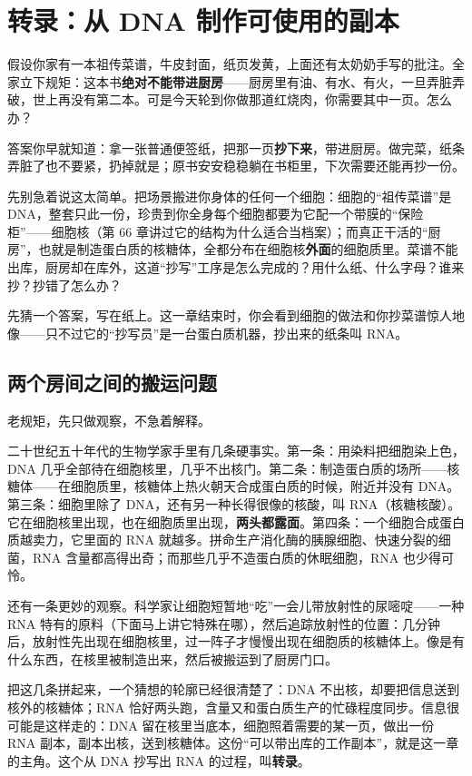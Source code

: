 \chapter{转录：从 DNA 制作可使用的副本}

\begin{kaichang}
假设你家有一本祖传菜谱，牛皮封面，纸页发黄，上面还有太奶奶手写的批注。全家立下规矩：这本书\textbf{绝对不能带进厨房}——厨房里有油、有水、有火，一旦弄脏弄破，世上再没有第二本。可是今天轮到你做那道红烧肉，你需要其中一页。怎么办？

答案你早就知道：拿一张普通便签纸，把那一页\textbf{抄下来}，带进厨房。做完菜，纸条弄脏了也不要紧，扔掉就是；原书安安稳稳躺在书柜里，下次需要还能再抄一份。

先别急着说这太简单。把场景搬进你身体的任何一个细胞：细胞的“祖传菜谱”是 DNA，整套只此一份，珍贵到你全身每个细胞都要为它配一个带膜的“保险柜”——细胞核（第 66 章讲过它的结构为什么适合当档案）；而真正干活的“厨房”，也就是制造蛋白质的核糖体，全都分布在细胞核\textbf{外面}的细胞质里。菜谱不能出库，厨房却在库外，这道“抄写”工序是怎么完成的？用什么纸、什么字母？谁来抄？抄错了怎么办？

先猜一个答案，写在纸上。这一章结束时，你会看到细胞的做法和你抄菜谱惊人地像——只不过它的“抄写员”是一台蛋白质机器，抄出来的纸条叫 RNA。
\end{kaichang}

\section{两个房间之间的搬运问题}

老规矩，先只做观察，不急着解释。

二十世纪五十年代的生物学家手里有几条硬事实。第一条：用染料把细胞染上色，DNA 几乎全部待在细胞核里，几乎不出核门。第二条：制造蛋白质的场所——核糖体——在细胞质里，核糖体上热火朝天合成蛋白质的时候，附近并没有 DNA。第三条：细胞里除了 DNA，还有另一种长得很像的核酸，叫 RNA（核糖核酸）。它在细胞核里出现，也在细胞质里出现，\textbf{两头都露面}。第四条：一个细胞合成蛋白质越卖力，它里面的 RNA 就越多。拼命生产消化酶的胰腺细胞、快速分裂的细菌，RNA 含量都高得出奇；而那些几乎不造蛋白质的休眠细胞，RNA 也少得可怜。

还有一条更妙的观察。科学家让细胞短暂地“吃”一会儿带放射性的尿嘧啶——一种 RNA 特有的原料（下面马上讲它特殊在哪），然后追踪放射性的位置：几分钟后，放射性先出现在细胞核里，过一阵子才慢慢出现在细胞质的核糖体上。像是有什么东西，在核里被制造出来，然后被搬运到了厨房门口。

把这几条拼起来，一个猜想的轮廓已经很清楚了：DNA 不出核，却要把信息送到核外的核糖体；RNA 恰好两头跑，含量又和蛋白质生产的忙碌程度同步。信息很可能是这样走的：DNA 留在核里当底本，细胞照着需要的某一页，做出一份 RNA 副本，副本出核，送到核糖体。这份“可以带出库的工作副本”，就是这一章的主角。这个从 DNA 抄写出 RNA 的过程，叫\textbf{转录}。

